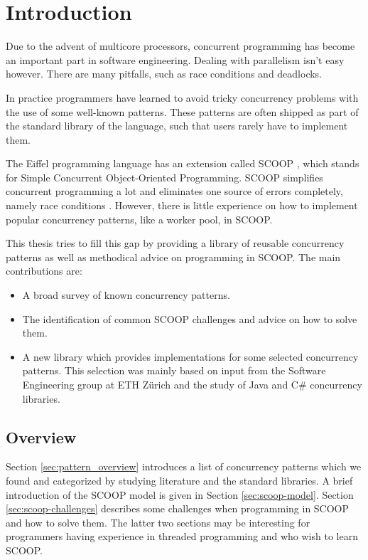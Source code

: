 \documentclass[a4paper,10pt,titlepage]{article}
\begin{document}
\newpage
{}

\section{Introduction}
\label{sec:introduction}


Due to the advent of multicore processors, concurrent programming has become an important part in software engineering.
Dealing with parallelism isn't easy however.
There are many pitfalls, such as race conditions and deadlocks.

In practice programmers have learned to avoid tricky concurrency problems with the use of some well-known patterns.
These patterns are often shipped as part of the standard library of the language, such that users rarely have to implement them.

The Eiffel programming language \cite{web:ecma-eiffel}\cite{book:touchofclass} has an extension called SCOOP \cite{Nienaltowski07}\cite{web:scoop},
which stands for Simple Concurrent Object-Oriented Programming.
SCOOP simplifies concurrent programming a lot and eliminates one source of errors completely, namely race conditions \cite{Nienaltowski07}.
However, there is little experience on how to implement popular concurrency patterns, like a worker pool, in SCOOP.

This thesis tries to fill this gap by providing a library of reusable concurrency patterns as well as methodical advice on programming in SCOOP.
The main contributions are:
\begin{itemize}
 \item A broad survey of known concurrency patterns.
 \item The identification of common SCOOP challenges and advice on how to solve them.
 \item A new library which provides implementations for some selected concurrency patterns.
 This selection was mainly based on input from the Software Engineering group at ETH Zürich and the study of Java \cite{web:java-concurrency} and C\# \cite{web:ms-tpl} concurrency libraries.
\end{itemize}

\subsection{Overview}

Section \ref{sec:pattern_overview} introduces a list of concurrency patterns which we found and categorized by studying literature and the standard libraries.
A brief introduction of the SCOOP model is given in Section \ref{sec:scoop-model}.
Section \ref{sec:scoop-challenges} describes some challenges when programming in SCOOP and how to solve them.
The latter two sections may be interesting for programmers having experience in threaded programming and who wish to learn SCOOP.
\end{document}
